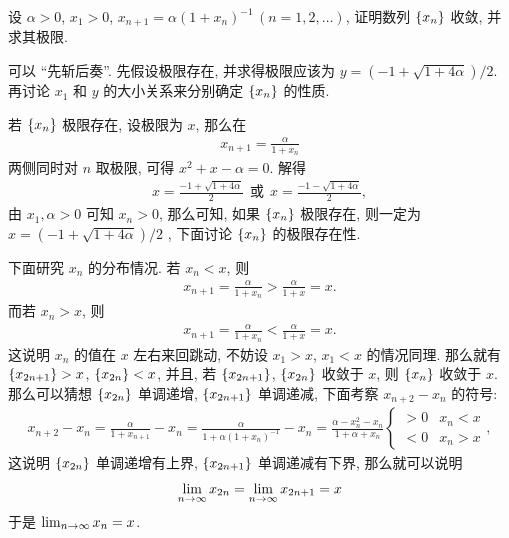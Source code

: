 \documentclass{ctexart}
\begin{document}
\begin{exercise}[resume=exer]
\begin{answer}
        \end{answer}
        \item 设 $ \alpha > 0 $, $ x_{1} > 0 $, $ x_{n + 1} = \alpha(1 + x_{n})^{-1}\,(n = 1, 2, \dots) $, 证明数列 $ \qty{x_{n}} $ 收敛, 并求其极限.
        \begin{hint}
            可以 ``先斩后奏''. 先假设极限存在, 并求得极限应该为 $ y = (-1 + \sqrt{1 + 4\alpha})/2 $. 再讨论 $ x_{1} $ 和 $ y $ 的大小关系来分别确定 $ \qty{x_{n}} $ 的性质. 
        \end{hint}
        \begin{answer}
            若 $ \qty{x_{n}} $ 极限存在, 设极限为 $ x $, 那么在
            \begin{align*}
                x_{n + 1} = \frac{\alpha}{1 + x_{n}}
            \end{align*}
            两侧同时对 $ n $ 取极限, 可得 $ x^{2} + x - \alpha = 0 $. 解得
            \begin{align*}
                x = \frac{-1 + \sqrt{1 + 4\alpha}}{2} \ \ \text{或}\ \  x = \frac{-1 - \sqrt{1 + 4\alpha}}{2},
            \end{align*}
            由 $ x_{1}, \alpha > 0 $ 可知 $ x_{n} > 0 $, 那么可知, 如果 $ \qty{x_{n}} $ 极限存在, 则一定为 $ x = (-1 + \sqrt{1 + 4\alpha})/2 $ , 下面讨论 $ \qty{x_{n}} $ 的极限存在性. 
            
            下面研究 $ x_{n} $ 的分布情况. 若 $ x_{n} < x $, 则
            \begin{align*}
                x_{n + 1} = \frac{\alpha}{1 + x_{n}} > \frac{\alpha}{1 + x} = x.
            \end{align*}
            而若 $ x_{n} > x $, 则
            \begin{align*}
                x_{n + 1} = \frac{\alpha}{1 + x_{n}} < \frac{\alpha}{1 + x} = x.
            \end{align*}
            这说明 $ x_{n} $ 的值在 $ x $ 左右来回跳动, 不妨设 $ x_{1} > x $, $ x_{1} < x $ 的情况同理. 那么就有 $ \qty{x_{2n + 1}} > x $, $ \qty{x_{2n}} < x $, 并且, 若 $ \qty{x_{2n + 1}} $, $ \qty{x_{2n}} $ 收敛于 $ x $, 则 $ \qty{x_{n}} $ 收敛于 $ x $. 那么可以猜想 $ \qty{x_{2n}} $ 单调递增, $ \qty{x_{2n + 1}} $ 单调递减, 下面考察 $ x_{n + 2} - x_{n} $ 的符号:
            \begin{align*}
                x_{n + 2} - x_{n} = \frac{\alpha}{1 + x_{n + 1}} - x_{n} = \frac{\alpha}{1 + \alpha(1 + x_{n})^{-1}} - x_{n} = \frac{\alpha - x_{n}^{2} - x_{n}}{1 + \alpha + x_{n}}\begin{cases}
                    > 0 & x_{n} < x\\
                    < 0 & x_{n} > x
                \end{cases},
            \end{align*}
            这说明 $ \qty{x_{2n}} $ 单调递增有上界, $ \qty{x_{2n + 1}} $ 单调递减有下界, 那么就可以说明
            \begin{align*}
                \lim_{n \to \infty}x_{2n} = \lim_{n \to \infty}x_{2n + 1} = x
            \end{align*} 
            于是 $ \lim_{n \to \infty}x_{n} = x $.
        \end{answer}
    \end{exercise}
    \stopexercise
\end{document}
